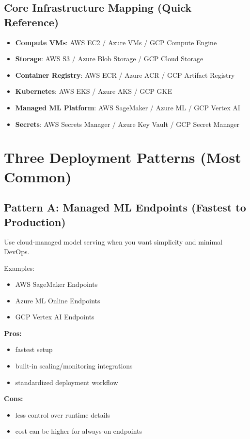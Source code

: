 \documentclass[11pt]{article}
\begin{document}
\subsection{Core Infrastructure Mapping (Quick Reference)}
\begin{itemize}
  \item \textbf{Compute VMs}: AWS EC2 / Azure VMs / GCP Compute Engine
  \item \textbf{Storage}: AWS S3 / Azure Blob Storage / GCP Cloud Storage
  \item \textbf{Container Registry}: AWS ECR / Azure ACR / GCP Artifact Registry
  \item \textbf{Kubernetes}: AWS EKS / Azure AKS / GCP GKE
  \item \textbf{Managed ML Platform}: AWS SageMaker / Azure ML / GCP Vertex AI
  \item \textbf{Secrets}: AWS Secrets Manager / Azure Key Vault / GCP Secret Manager
\end{itemize}

\section{Three Deployment Patterns (Most Common)}

\subsection{Pattern A: Managed ML Endpoints (Fastest to Production)}
Use cloud-managed model serving when you want simplicity and minimal DevOps.

Examples:
\begin{itemize}
  \item AWS SageMaker Endpoints
  \item Azure ML Online Endpoints
  \item GCP Vertex AI Endpoints
\end{itemize}

\textbf{Pros:}
\begin{itemize}
  \item fastest setup
  \item built-in scaling/monitoring integrations
  \item standardized deployment workflow
\end{itemize}

\textbf{Cons:}
\begin{itemize}
  \item less control over runtime details
  \item cost can be higher for always-on endpoints
\end{itemize}
\end{document}
